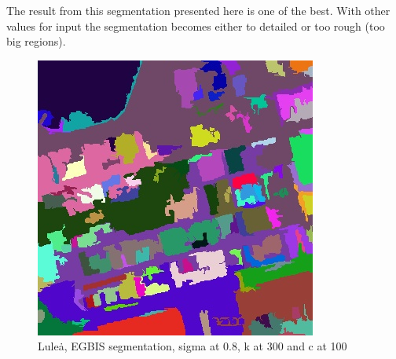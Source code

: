 The result from this segmentation presented here is one of the best. With other
values for input the segmentation becomes either to detailed or too rough
(too big regions).
\begin{figure}[ht]
    \begin{minipage}[t]{\linewidth}
        \centering
        \includegraphics[width=\textwidth]{images/bing/lulea-egbis.jpg}
        \caption{Lule\.{a}, EGBIS segmentation, sigma at 0.8, k at 300 and c at 100}
        \label{fig:luleaEGBIS}
    \end{minipage}
\end{figure}

